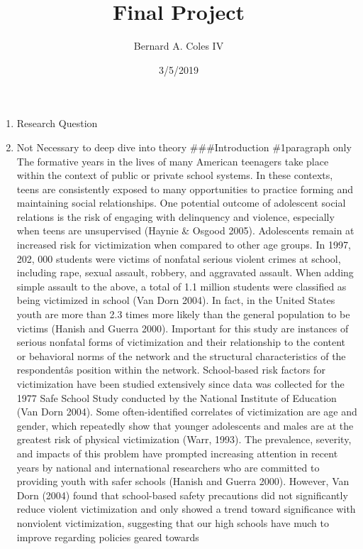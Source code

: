\documentclass[]{article}
\title{Final Project}
\author{Bernard A. Coles IV}
\date{3/5/2019}
\providecommand{\tightlist}{%
  \setlength{\itemsep}{0pt}\setlength{\parskip}{0pt}}
\begin{document}
\maketitle

\begin{enumerate}
\def\labelenumi{(\arabic{enumi})}
\tightlist
\item
  Research Question
\item
  Not Necessary to deep dive into theory \#\#\#Introduction \#1paragraph
  only The formative years in the lives of many American teenagers take
  place within the context of public or private school systems. In these
  contexts, teens are consistently exposed to many opportunities to
  practice forming and maintaining social relationships. One potential
  outcome of adolescent social relations is the risk of engaging with
  delinquency and violence, especially when teens are unsupervised
  (Haynie \& Osgood 2005). Adolescents remain at increased risk for
  victimization when compared to other age groups. In 1997, 202, 000
  students were victims of nonfatal serious violent crimes at school,
  including rape, sexual assault, robbery, and aggravated assault. When
  adding simple assault to the above, a total of 1.1 million students
  were classified as being victimized in school (Van Dorn 2004). In
  fact, in the United States youth are more than 2.3 times more likely
  than the general population to be victims (Hanish and Guerra 2000).
  Important for this study are instances of serious nonfatal forms of
  victimization and their relationship to the content or behavioral
  norms of the network and the structural characteristics of the
  respondentâs position within the network. School-based risk factors
  for victimization have been studied extensively since data was
  collected for the 1977 Safe School Study conducted by the National
  Institute of Education (Van Dorn 2004). Some often-identified
  correlates of victimization are age and gender, which repeatedly show
  that younger adolescents and males are at the greatest risk of
  physical victimization (Warr, 1993). The prevalence, severity, and
  impacts of this problem have prompted increasing attention in recent
  years by national and international researchers who are committed to
  providing youth with safer schools (Hanish and Guerra 2000). However,
  Van Dorn (2004) found that school-based safety precautions did not
  significantly reduce violent victimization and only showed a trend
  toward significance with nonviolent victimization, suggesting that our
  high schools have much to improve regarding policies geared towards

\end{enumerate}
\end{document}
